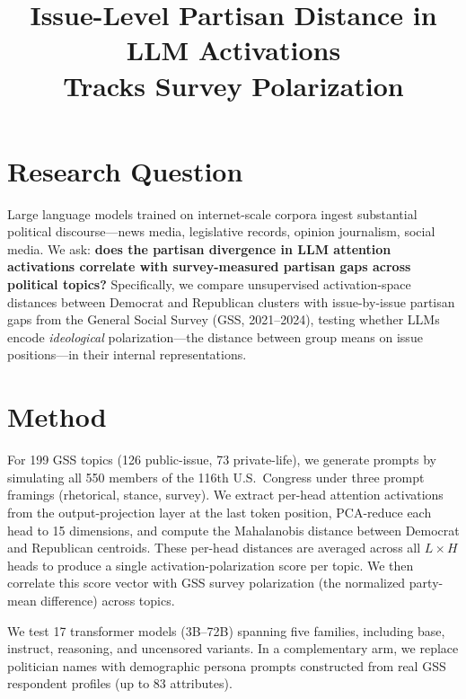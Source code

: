 \documentclass[11pt]{article}
\title{Issue-Level Partisan Distance in LLM Activations\\Tracks Survey Polarization}
\author{}
\date{}
\begin{document}
\maketitle
\thispagestyle{empty}

\section*{Research Question}

Large language models trained on internet-scale corpora ingest substantial political discourse---news media, legislative records, opinion journalism, social media. We ask: \textbf{does the partisan divergence in LLM attention activations correlate with survey-measured partisan gaps across political topics?} Specifically, we compare unsupervised activation-space distances between Democrat and Republican clusters with issue-by-issue partisan gaps from the General Social Survey (GSS, 2021--2024), testing whether LLMs encode \emph{ideological} polarization---the distance between group means on issue positions---in their internal representations.

\section*{Method}

For 199 GSS topics (126 public-issue, 73 private-life), we generate prompts by simulating all 550 members of the 116th U.S.\ Congress under three prompt framings (rhetorical, stance, survey). We extract per-head attention activations from the output-projection layer at the last token position, PCA-reduce each head to 15 dimensions, and compute the Mahalanobis distance between Democrat and Republican centroids. These per-head distances are averaged across all $L \times H$ heads to produce a single activation-polarization score per topic. We then correlate this score vector with GSS survey polarization (the normalized party-mean difference) across topics.

We test 17 transformer models (3B--72B) spanning five families, including base, instruct, reasoning, and uncensored variants. In a complementary arm, we replace politician names with demographic persona prompts constructed from real GSS respondent profiles (up to 83 attributes).
\end{document}
